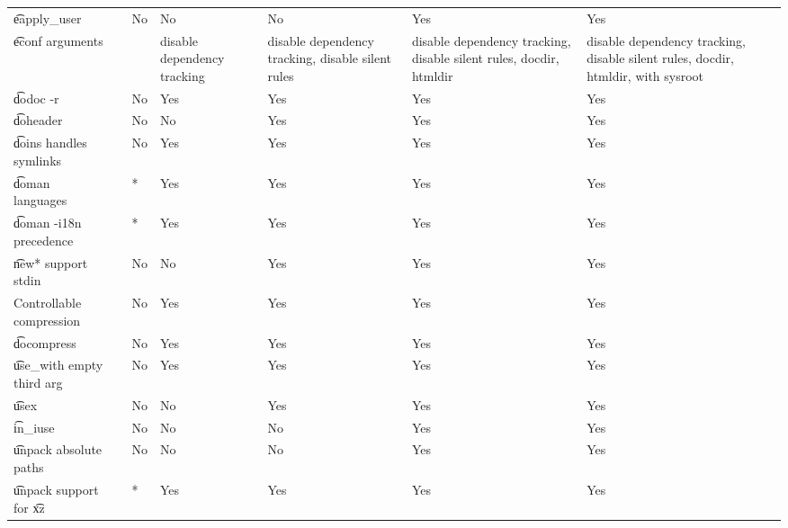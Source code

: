 \begin{landscape}
\begin{longtable}{llP{7.5em}P{7.5em}P{7.5em}P{7.5em}P{7.5em}}
\t{eapply_user} &  &
    No & No & No & Yes & Yes \\

\t{econf} arguments &  &
    & disable dependency tracking &
    disable dependency tracking, disable silent rules &
    disable dependency tracking, disable silent rules, docdir, htmldir &
    disable dependency tracking, disable silent rules, docdir, htmldir, with sysroot \\

\t{dodoc -r} &  &
    No & Yes & Yes & Yes & Yes \\

\t{doheader} &  &
    No & No & Yes & Yes & Yes \\

\t{doins} handles symlinks &  &
    No & Yes & Yes & Yes & Yes \\

\t{doman} languages &  &
    * & Yes & Yes & Yes & Yes \\

\t{doman -i18n} precedence &  &
    * & Yes & Yes & Yes & Yes \\

\t{new*} support stdin &  &
    No & No & Yes & Yes & Yes \\

Controllable compression &  &
    No & Yes & Yes & Yes & Yes \\

\t{docompress} &  &
    No & Yes & Yes & Yes & Yes \\

\t{use_with} empty third arg &  &
    No & Yes & Yes & Yes & Yes \\

\t{usex} &  &
    No & No & Yes & Yes & Yes \\

\t{in_iuse} &  &
    No & No & No & Yes & Yes \\

\t{unpack} absolute paths &  &
    No & No & No & Yes & Yes \\

\t{unpack} support for \t{xz} &  &
    * & Yes & Yes & Yes & Yes \\


\end{longtable}
\end{landscape}
